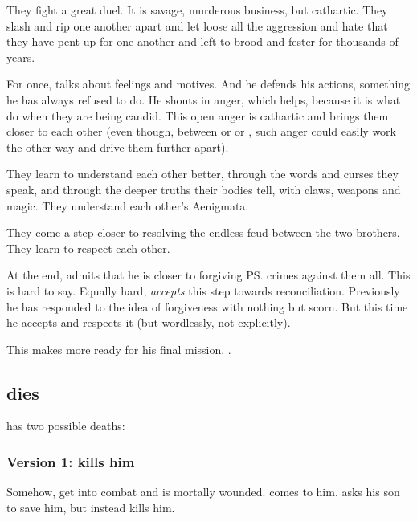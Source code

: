 \begin{garbage}
They fight a great duel. 
It is savage, murderous business, but cathartic. 
They slash and rip one another apart and let loose all the aggression and hate that they have pent up for one another and left to brood and fester for thousands of years. 

For once, \Ishnaruchaefir{} talks about feelings and motives. 
And he defends his actions, something he has always refused to do. 
He shouts in anger, which helps, because it is what \dragons{} do when they are being candid. 
This open anger is cathartic and brings them closer to each other (even though, between \resphain{} or \humans{} or \scathae, such anger could easily work the other way and drive them further apart). 

They learn to understand each other better, through the words and curses they speak, and through the deeper truths their bodies tell, with claws, weapons and magic. 
They understand each other's Aenigmata. 

They come a step closer to resolving the endless feud between the two brothers. 
They learn to respect each other. 

At the end, \Secherdamon{} admits that he is closer to forgiving \ps{\Ishnaruchaefir} crimes against them all. 
This is hard to say. 
Equally hard, \Ishnaruchaefir{} \emph{accepts} this step towards reconciliation. 
Previously he has responded to the idea of forgiveness with nothing but scorn. 
But this time he accepts and respects it (but wordlessly, not explicitly). 

This makes \Secherdamon{} more ready for his final mission. 
. 










\subsection{\Secherdamon{} dies}
\Secherdamon{} has two possible deaths: 





\subsubsection{Version 1: \Vizsherioch{} kills him}
Somehow, \Secherdamon{} get into combat and is mortally wounded. \Vizsherioch{} comes to him. 
\Secherdamon{} asks his son to save him, but \Vizsherioch{} instead kills him. 


\end{garbage}
